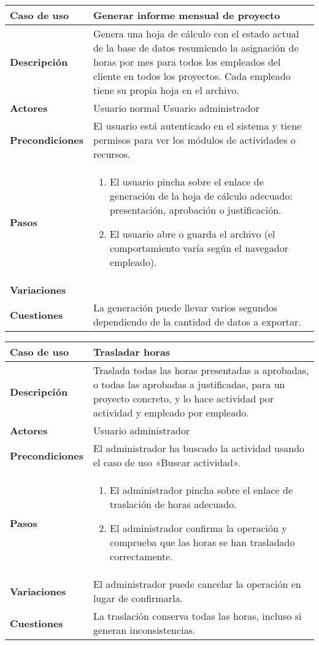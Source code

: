\begin{tabular}{|p{1.25in}|p{3.65in}|}\hline
\textbf{Caso de uso} & \textbf{Generar informe mensual de
proyecto}\\\hline\hline
\textbf{Descripción} & Genera una hoja de cálculo con el estado actual de la
base de datos resumiendo la asignación de horas por mes para todos los empleados
del cliente en todos los proyectos. Cada empleado tiene su propia hoja en el
archivo.
\\\hline
\textbf{Actores} & Usuario normal \newline Usuario administrador\\\hline
\textbf{Precondiciones} & El usuario está autenticado en el sistema y
tiene permisos para ver los módulos de actividades o recursos. \\\hline
\textbf{Pasos} &
  \begin{enumerate}
   \item El usuario pincha sobre el enlace de generación de la hoja de cálculo
adecuado: presentación, aprobación o justificación.
   \item El usuario abre o guarda el archivo (el comportamiento varía según el
navegador empleado).
  \end{enumerate}
\\\hline
\textbf{Variaciones} & \\\hline
\textbf{Cuestiones} & La generación puede llevar varios segundos
dependiendo de la cantidad de datos a exportar.\\\hline
\end{tabular}

\begin{tabular}{|p{1.25in}|p{3.65in}|}\hline
\textbf{Caso de uso} & \textbf{Trasladar horas}\\\hline\hline
\textbf{Descripción} & Traslada todas las horas presentadas a aprobadas, o
todas las aprobadas a justificadas, para un proyecto concreto, y lo hace
actividad por actividad y empleado por empleado.
\\\hline
\textbf{Actores} & Usuario administrador\\\hline
\textbf{Precondiciones} & El administrador ha
buscado la actividad usando el caso de uso «Buscar actividad». \\\hline
\textbf{Pasos} &
  \begin{enumerate}
   \item El administrador pincha sobre el enlace de traslación de horas
adecuado.
   \item El administrador confirma la operación y comprueba que las horas se han
trasladado correctamente.
  \end{enumerate}
\\\hline
\textbf{Variaciones} & El administrador puede cancelar la operación en
lugar de confirmarla. \\\hline
\textbf{Cuestiones} & La traslación conserva todas las horas, incluso
si generan inconsistencias.\\\hline
\end{tabular}

